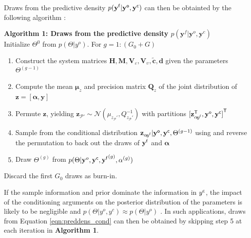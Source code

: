 \documentclass[notitlepage,a4paper,12pt]{article}
\newcommand{\transpose}[1]{{#1}^{\sf{T}}}
\begin{document}
Draws from the predictive density $p(\mathbf{y^{\sf{f}}}|\mathbf{y^{\sf{o}}}, \mathbf{y^{\sf{c}}})$ can then be obtainted by the following algorithm \citep[see also][Algorithm 1]{waggonerzha1999_res}:\\

\hfill\begin{minipage}{\dimexpr\textwidth-1cm}
    \noindent\textbf{Algorithm 1: Draws from the predictive density $p(\mathbf{y}^f | \mathbf{y}^o, \mathbf{y}^c)$}\\

    Initialize $\Theta^{0}$ from $p(\Theta | y^o)$. For $g=1:(G_0+G)$
    
    \begin{enumerate}    
        \item Construct the system matrices $\mathbf{H}, \mathbf{M}, \mathbf{V}_{\!\varepsilon}, \mathbf{V}_{\!\upsilon}, \tilde{\mathbf{c}}, \mathbf{d}$ given the parameters $\Theta^{(g-1)}$
        \item Compute the mean $\boldsymbol{\mu}_{z}$ and precision matrix $\mathbf{Q}_{z}$ of the joint distribution of $\mathbf{z} = [\boldsymbol{\alpha}, \mathbf{y}]$  
        \item Permute $\mathbf{z}$, yielding $\mathbf{z}_{\mathcal{P}'} \sim \mathcal{N}(\mu_{z_\mathcal{P}'}, Q_{z_\mathcal{P}'}^{-1})$ with partitions $\transpose{[\mathbf{z}^{\sf{T}}_{\alpha\! y^{\sf{f}}}, \mathbf{y}^{\sf{o}}, \mathbf{y}^{\sf{c}}]}$
        \item Sample from the conditional distribution $\mathbf{z}_{\alpha\! y^{\sf{f}}} | \mathbf{y}^{\sf{o}}, \mathbf{y}^{\sf{c}}, \Theta^{(g-1)}$ using \citep[][Algorithm 2.1 and 2.4]{rueheld_2005} and reverse the permutation to back out the draws of $\mathbf{y}^{\sf{f}}$ and $\boldsymbol{\alpha}$
        \item Draw $\Theta^{(g)}$ from $p(\Theta|\mathbf{y}^o, \mathbf{y}^{\sf{c}}, {\mathbf{y}^{\sf{f}}}^{(g)}, \alpha^{(g)})$ 
     \end{enumerate}
    
    Discard the first $G_0$ draws as burn-in.\\


    \xdef\tpd{\the\prevdepth}
\end{minipage}

If the sample information and prior dominate the information in $y^{\sf{c}}$, the impact of the conditioning arguments on the posterior distribution of the parameters is likely to be negligible and $p(\Theta | y^o, y^c) \approx p(\Theta | y^o)$ \citep{delnegro_schorfheide_2013_hb,bgl_2015ijf}. In such applications, draws from Equation \ref{eqn:preddens_cond} can then be obtained by skipping step 5 at each iteration in \textbf{Algorithm 1}.\\
\end{document}
